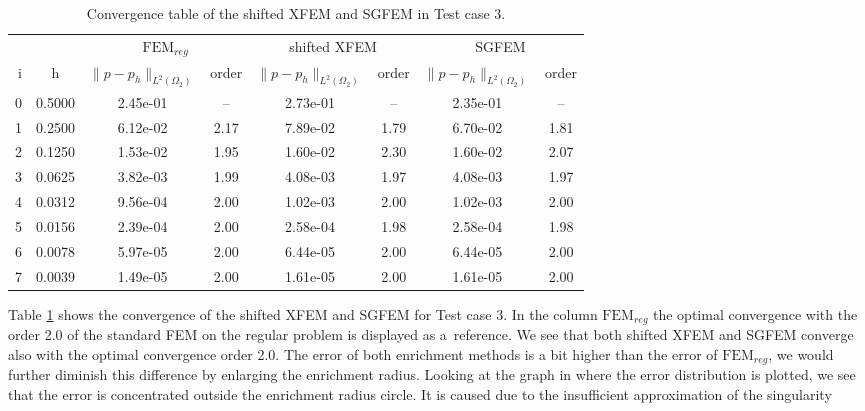 \begin{table}[!htb]
\begin{center}
\bgroup
\def\arraystretch{1.2}
\setlength\tabcolsep{5pt}
\begin{tabular}{rc|cc|cc|cc}
\toprule
\multicolumn{2}{c|}{} & \multicolumn{2}{c|}{$\textrm{FEM}_{reg}$} & \multicolumn{2}{c|}{shifted XFEM} & \multicolumn{2}{c}{SGFEM}\\ [3pt] %
i & h & $\|p-p_h\|_{L^2(\Omega_2)}$ & order & $\|p-p_h\|_{L^2(\Omega_2)}$ & order & $\|p-p_h\|_{L^2(\Omega_2)}$ & order \\ [3pt] \midrule
0 & 0.5000 & 2.45e-01 & --   & 2.73e-01 & --   & 2.35e-01 & --   \\ %
1 & 0.2500 & 6.12e-02 & 2.17 & 7.89e-02 & 1.79 & 6.70e-02 & 1.81 \\ %
2 & 0.1250 & 1.53e-02 & 1.95 & 1.60e-02 & 2.30 & 1.60e-02 & 2.07 \\ %
3 & 0.0625 & 3.82e-03 & 1.99 & 4.08e-03 & 1.97 & 4.08e-03 & 1.97 \\ %
4 & 0.0312 & 9.56e-04 & 2.00 & 1.02e-03 & 2.00 & 1.02e-03 & 2.00 \\ %
5 & 0.0156 & 2.39e-04 & 2.00 & 2.58e-04 & 1.98 & 2.58e-04 & 1.98 \\ %
6 & 0.0078 & 5.97e-05 & 2.00 & 6.44e-05 & 2.00 & 6.44e-05 & 2.00 \\ %
7 & 0.0039 & 1.49e-05 & 2.00 & 1.61e-05 & 2.00 & 1.61e-05 & 2.00 \\ %
\bottomrule
\end{tabular}
\caption[Convergence table in Test case 3.]
{Convergence table of the shifted XFEM and SGFEM in Test case 3.}
\label{tab:convergence_test3}
\egroup
\end{center}
\end{table}
%
Table \ref{tab:convergence_test3} shows the convergence of the shifted XFEM and SGFEM for Test case 3.
In the column $\textrm{FEM}_{reg}$ the optimal convergence with the order 2.0 of the standard FEM on the regular problem is displayed as a~reference.
We see that both shifted XFEM and SGFEM converge also with the optimal convergence order 2.0. The error of both enrichment methods is a bit higher than the error of $\textrm{FEM}_{reg}$, we would further diminish this
difference by enlarging the enrichment radius. Looking at the graph in  where the error distribution is plotted,
we see that the error is concentrated outside the enrichment radius circle. It is caused due to the insufficient approximation of the singularity
